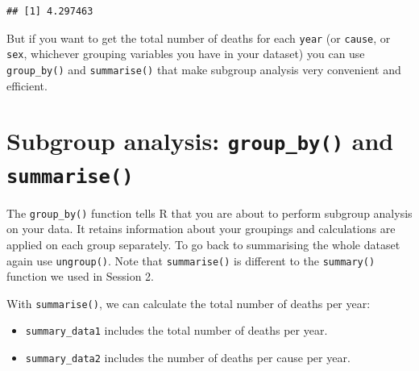 \documentclass[]{book}
\makeatletter
\newenvironment{Shaded}{\begin{snugshade}}{\end{snugshade}}
\newcommand{\DataTypeTok}[1]{\textcolor[rgb]{0.13,0.29,0.53}{#1}}
\newcommand{\KeywordTok}[1]{\textcolor[rgb]{0.13,0.29,0.53}{\textbf{#1}}}
\newcommand{\NormalTok}[1]{#1}
\newcommand{\OperatorTok}[1]{\textcolor[rgb]{0.81,0.36,0.00}{\textbf{#1}}}
\newcommand{\StringTok}[1]{\textcolor[rgb]{0.31,0.60,0.02}{#1}}
\providecommand{\tightlist}{%
  \setlength{\itemsep}{0pt}\setlength{\parskip}{0pt}}
\newenvironment{kframe}{%
\medskip{}
\setlength{\fboxsep}{.8em}
 \def\at@end@of@kframe{}%
 \ifinner\ifhmode%
  \def\at@end@of@kframe{\end{minipage}}%
  \begin{minipage}{\columnwidth}%
 \fi\fi%
 \def\FrameCommand##1{\hskip\@totalleftmargin \hskip-\fboxsep
 \colorbox{shadecolor}{##1}\hskip-\fboxsep
     \hskip-\linewidth \hskip-\@totalleftmargin \hskip\columnwidth}%
 \MakeFramed {\advance\hsize-\width
   \@totalleftmargin\z@ \linewidth\hsize
   \@setminipage}}%
 {\par\unskip\endMakeFramed%
 \at@end@of@kframe}
\renewenvironment{Shaded}{\begin{kframe}}{\end{kframe}}
\theoremstyle{definition}
\theoremstyle{definition}
\theoremstyle{definition}
\theoremstyle{remark}
\makeatother
\begin{document}
\begin{verbatim}
## [1] 4.297463
\end{verbatim}

But if you want to get the total number of deaths for each \texttt{year}
(or \texttt{cause}, or \texttt{sex}, whichever grouping variables you
have in your dataset) you can use \texttt{group\_by()} and
\texttt{summarise()} that make subgroup analysis very convenient and
efficient.

\hypertarget{subgroup-analysis-group_by-and-summarise}{%
\section{\texorpdfstring{Subgroup analysis: \texttt{group\_by()} and
\texttt{summarise()}}{Subgroup analysis: group\_by() and summarise()}}\label{subgroup-analysis-group_by-and-summarise}}

The \texttt{group\_by()} function tells R that you are about to perform
subgroup analysis on your data. It retains information about your
groupings and calculations are applied on each group separately. To go
back to summarising the whole dataset again use \texttt{ungroup()}. Note
that \texttt{summarise()} is different to the \texttt{summary()}
function we used in Session 2.

With \texttt{summarise()}, we can calculate the total number of deaths
per year:

\begin{Shaded}
\end{Shaded}

\begin{itemize}
\tightlist
\item
  \texttt{summary\_data1} includes the total number of deaths per year.
\item
  \texttt{summary\_data2} includes the number of deaths per cause per
  year.
\end{itemize}
\end{document}

